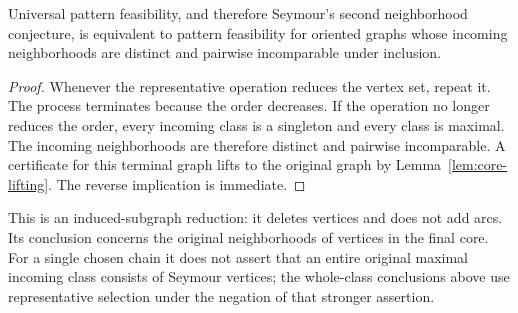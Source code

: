 \begin{corollary}
\label{cor:paper-terminal-incoming-core}
Universal pattern feasibility, and therefore Seymour's second neighborhood
conjecture, is equivalent to pattern feasibility for oriented graphs
whose incoming neighborhoods are distinct and pairwise incomparable
under inclusion.
\end{corollary}
\begin{proof}
Whenever the representative operation reduces the vertex set, repeat
it. The process terminates because the order decreases. If the
operation no longer reduces the order, every incoming class is a
singleton and every class is maximal. The incoming neighborhoods are
therefore distinct and pairwise incomparable. A certificate for this
terminal graph lifts to the original graph by
Lemma~\ref{lem:core-lifting}. The reverse implication is immediate.
\end{proof}

This is an induced-subgraph reduction: it deletes vertices and does not
add arcs. Its conclusion concerns the original neighborhoods of vertices
in the final core. For a single chosen chain it does not assert that
an entire original maximal incoming class consists of Seymour vertices;
the whole-class conclusions above use representative selection under
the negation of that stronger assertion.

